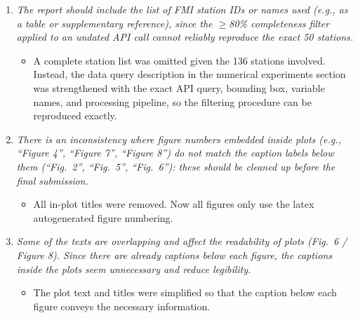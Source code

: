 \documentclass[11pt,onecolumn]{IEEEtran}
\begin{document}
\begin{enumerate}

      \item[1.1] {\em The report should include the list of FMI station IDs or names used (e.g., as a table or
            supplementary reference), since the $\geq$80\% completeness filter applied to an undated API call
            cannot reliably reproduce the exact 50 stations.}

            \vspace*{2mm}

            \begin{itemize}
                  \item A complete station list was omitted given the 136 stations involved. Instead, the data query description in the numerical experiments section was strengthened with the exact API query, bounding box, variable names, and processing pipeline, so the filtering procedure can be reproduced exactly.
            \end{itemize}

            \vspace*{4mm}

      \item[1.2] {\em There is an inconsistency where figure numbers embedded inside plots (e.g., ``Figure 4'',
            ``Figure 7'', ``Figure 8'') do not match the caption labels below them (``Fig.\ 2'', ``Fig.\ 5'',
            ``Fig.\ 6''): these should be cleaned up before the final submission.}

            \vspace*{2mm}
            \begin{itemize}
                  \item All in-plot titles were removed. Now all figures only use the latex autogenerated figure numbering.
            \end{itemize}
            \vspace*{4mm}

      \item[1.3] {\em Some of the texts are overlapping and affect the readability of plots (Fig.\ 6 / Figure 8).
            Since there are already captions below each figure, the captions inside the plots seem unnecessary
            and reduce legibility.}

            \vspace*{2mm}
            \begin{itemize}
                  \item The plot text and titles were simplified so that the caption below each figure conveys the necessary information.
            \end{itemize}
            \vspace*{4mm}

\end{enumerate}
\end{document}

